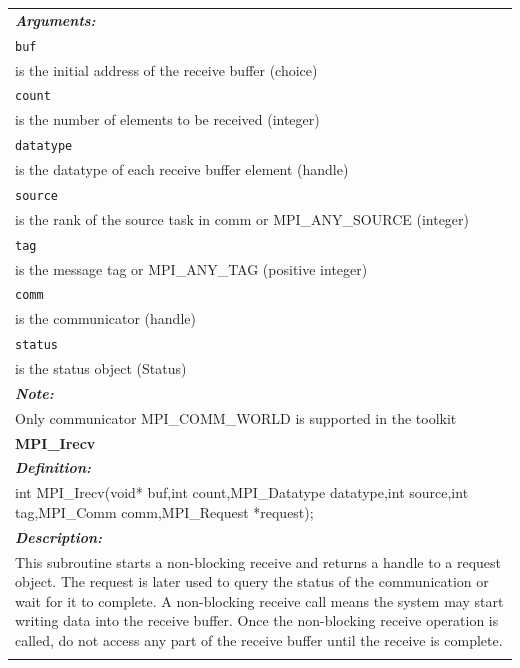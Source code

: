 \begin{longtable}{|p{5.5in}|}
\emph{\bfseries{Arguments: }} \\
\lstinline$buf$\\
\hspace{0.5cm}     is the initial address of the receive buffer (choice)\\
\lstinline$count$\\
\hspace{0.5cm}     is the number of elements to be received (integer)\\
\lstinline$datatype$\\
\hspace{0.5cm}     is the datatype of each receive buffer element (handle)\\
\lstinline$source$\\
\hspace{0.5cm}     is the rank of the source task in comm or MPI\_ANY\_SOURCE (integer)\\
\lstinline$tag$\\
\hspace{0.5cm}     is the message tag or MPI\_ANY\_TAG (positive integer)\\
\lstinline$comm$\\
\hspace{0.5cm}     is the communicator (handle)\\
\lstinline$status$\\
\hspace{0.5cm}     is the status object (Status) \\
\vspace{-0.3cm}

\emph{\bfseries{Note: }} \\
Only communicator MPI\_COMM\_WORLD is supported in the toolkit\\

\hline

\vspace{-0.8cm}

\LARGE{\bfseries{MPI\_Irecv}} \\

\vspace{-0.3cm}

\emph{\bfseries{Definition: }} \\
int MPI\_Irecv(void* buf,int count,MPI\_Datatype datatype,int source,int tag,MPI\_Comm comm,MPI\_Request *request); \\
\vspace{-0.3cm}

\emph{\bfseries{Description: }} \\
This subroutine starts a non-blocking receive and returns a handle to a request object. The request is later used to query the status of the communication or wait for it to complete. A non-blocking receive call means the system may start writing data into the receive buffer. Once the non-blocking receive operation is called, do not access any part of the receive buffer until the receive is complete. \\
\vspace{-0.3cm}


\end{longtable}
